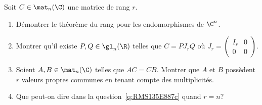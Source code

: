 \begin{enonce}
\begin{exercise}[ID={RMS135 E887},subtitle={Mines-Ponts PSI 2024},tags={oraux},difficulty={}]
  Soit $C\in\mat_n(\C)$ une matrice de rang $r$.

  \begin{enumerate}
  \item Démontrer le théorème du rang pour les endomorphismes de $\C^n$.

  \item Montrer qu'il existe $P,Q\in\gl_n(\R)$ telles que $C = P J_r Q$ où $J_r = \begin{pmatrix} I_r & 0\\ 0 & 0 \end{pmatrix}$.

    \item\label{q:RMS135E887c} Soient $A,B\in\mat_n(\C)$ telles que $AC = CB$.
      Montrer que $A$ et $B$ possèdent $r$ valeurs propres communes en tenant compte des multiplicités.

    \item Que peut-on dire dans la question~\ref{q:RMS135E887c} quand $r=n$?
  \end{enumerate}
\end{exercise}
\begin{solution}
\end{solution}
\end{enonce}
